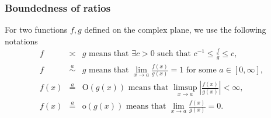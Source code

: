 \documentclass[12pt]{amsart}
\numberwithin{equation}{section}
\renewcommand{\le}{\leqslant}
\theoremstyle{definition}
\theoremstyle{assump}
\theoremstyle{remark}
\begin{document}
\subsubsection{Boundedness of ratios}
For two functions $f,g$ defined on the complex plane, we use the following notations
\begin{eqnarray*}
	f&\asymp &g  \text{ means that $\exists  c>0$ such that  $c^{-1}\le\frac{f}{g}\le c$,} \\
	f&\overset{a}{\sim}& g \text{ means that $\lim_{x\to a}\frac{f(x)}{g(x)}=1$ for some $a\in[0,\infty]$}, \\
	f(x)&\overset{a}{=}&\mathrm{O}(g(x)) \text{ means that $\limsup_{x\to a}\left|\frac{f(x)}{g(x)}\right|<\infty$},\\
	f(x)&\overset{a}{=}&\mathrm{o}(g(x)) \text{ means that $\lim_{x\to a}\frac{f(x)}{g(x)}=0$}.
\end{eqnarray*}
\end{document}
